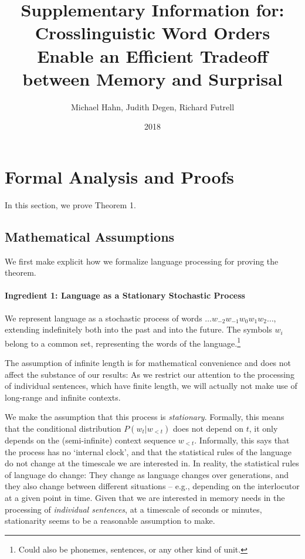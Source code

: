 \documentclass[11pt,letterpaper]{article}
\title{Supplementary Information for: Crosslinguistic Word Orders Enable an Efficient Tradeoff between Memory and Surprisal}
\author{Michael Hahn, Judith Degen, Richard Futrell}
\date{2018}
\newcounter{theorem}
\begin{document}
\maketitle




%
%
%


\section{Formal Analysis and Proofs}

In this section, we prove Theorem 1.

\subsection{Mathematical Assumptions}

We first make explicit how we formalize language processing for proving the theorem.


\paragraph{Ingredient 1: Language as a Stationary Stochastic Process}
We represent language as a stochastic process of words $\dots w_{-2} w_{-1} w_0 w_{1} w_{2} \dots$, extending indefinitely both into the past and into the future.
The symbols $w_i$ belong to a common set, representing the words of the language.\footnote{Could also be phonemes, sentences, or any other kind of unit.}


The assumption of infinite length is for mathematical convenience and does not affect the substance of our results:
As we restrict our attention to the processing of individual sentences, which have finite length, we will actually not make use of long-range and infinite contexts.

We make the assumption that this process is \emph{stationary}.
Formally, this means that the conditional distribution $P(w_t|w_{<t})$ does not depend on $t$, it only depends on the (semi-infinite) context sequence $w_{<t}$.
Informally, this says that the process has no `internal clock', and that the statistical rules of the language do not change at the timescale we are interested in.
In reality, the statistical rules of language do change: They change as language changes over generations, and they also change between different situations -- e.g., depending on the interlocutor at a given point in time.
Given that we are interested in memory needs in the processing of \emph{individual sentences}, at a timescale of seconds or minutes, stationarity seems to be a reasonable assumption to make.
\end{document}
